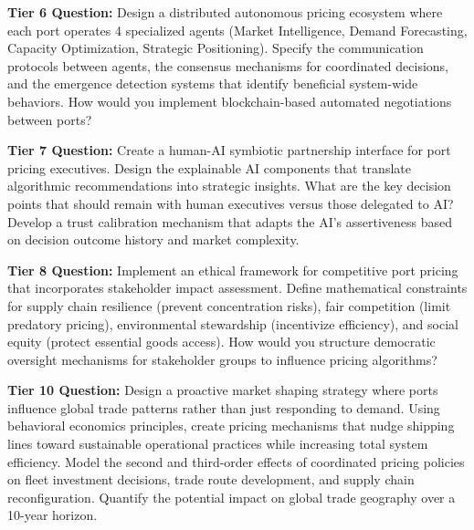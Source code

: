 \documentclass{article}
\begin{document}
\textbf{Tier 6 Question:} Design a distributed autonomous pricing ecosystem where each port operates 4 specialized agents (Market Intelligence, Demand Forecasting, Capacity Optimization, Strategic Positioning). Specify the communication protocols between agents, the consensus mechanisms for coordinated decisions, and the emergence detection systems that identify beneficial system-wide behaviors. How would you implement blockchain-based automated negotiations between ports?

\textbf{Tier 7 Question:} Create a human-AI symbiotic partnership interface for port pricing executives. Design the explainable AI components that translate algorithmic recommendations into strategic insights. What are the key decision points that should remain with human executives versus those delegated to AI? Develop a trust calibration mechanism that adapts the AI's assertiveness based on decision outcome history and market complexity.

\textbf{Tier 8 Question:} Implement an ethical framework for competitive port pricing that incorporates stakeholder impact assessment. Define mathematical constraints for supply chain resilience (prevent concentration risks), fair competition (limit predatory pricing), environmental stewardship (incentivize efficiency), and social equity (protect essential goods access). How would you structure democratic oversight mechanisms for stakeholder groups to influence pricing algorithms?

\textbf{Tier 10 Question:} Design a proactive market shaping strategy where ports influence global trade patterns rather than just responding to demand. Using behavioral economics principles, create pricing mechanisms that nudge shipping lines toward sustainable operational practices while increasing total system efficiency. Model the second and third-order effects of coordinated pricing policies on fleet investment decisions, trade route development, and supply chain reconfiguration. Quantify the potential impact on global trade geography over a 10-year horizon.
\end{document}
